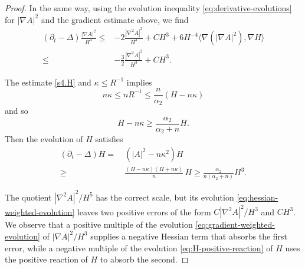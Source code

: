 \documentclass[11pt,reqno]{amsart}
\theoremstyle{definition}
\theoremstyle{remark}
\numberwithin{equation}{section}
\begin{document}
\begin{proof}
  In the same way, using the evolution inequality \eqref{eq:derivative-evolutions} for $|\nabla A|^2$ and the
  gradient estimate above, we find
  \begin{align}\label{eq:gradient-weighted-evolution}
    (\partial_t-\Delta)\frac{|\nabla A|^2}{H^3}
    \leq&
    -2\frac{|\nabla^2A|^2}{H^3}
    +CH^3
    +6H^{-4}
    \langle\nabla(|\nabla A|^2),\nabla H\rangle\nonumber\\
     \leq &
    -\frac32\frac{|\nabla^2A|^2}{H^3}
    +CH^3.
  \end{align}

  The estimate \eqref{s4.H} and $\kappa\leq R^{-1}$ implies
   \begin{equation*}
  n\kappa
  \leq nR^{-1}
  \leq\frac n{\alpha_2}(H-n\kappa)
  \end{equation*}
  and so 
  \begin{equation*}
  H-n\kappa
  \geq\frac{\alpha_2}{\alpha_2+n}H. 
  \end{equation*}
  Then the evolution of $H$ satisfies 
  \begin{align}\label{eq:H-positive-reaction}
    (\partial_t-\Delta)H
    =&~(|A|^2-n\kappa^2)H\nonumber\\
    \geq &~  
    \frac{(H-n\kappa)(H+n\kappa)}{n}\,H  \geq\frac{\alpha_2}{n(\alpha_2+n)}H^3.
  \end{align}

  The quotient $|\nabla^2A|^2/H^5$ has the correct scale, but its evolution \eqref{eq:hessian-weighted-evolution}
  leaves two positive errors of the form
  $C|\nabla^2A|^2/H^3$ and $CH^3$.  We observe that a positive multiple of the evolution \eqref{eq:gradient-weighted-evolution} of  $|\nabla A|^2/H^3$ supplies a negative
  Hessian term that absorbs the first error, while a negative multiple of the evolution \eqref{eq:H-positive-reaction} of $H$
  uses the positive reaction of $H$ to absorb the second. 
  

\end{proof}
\end{document}
